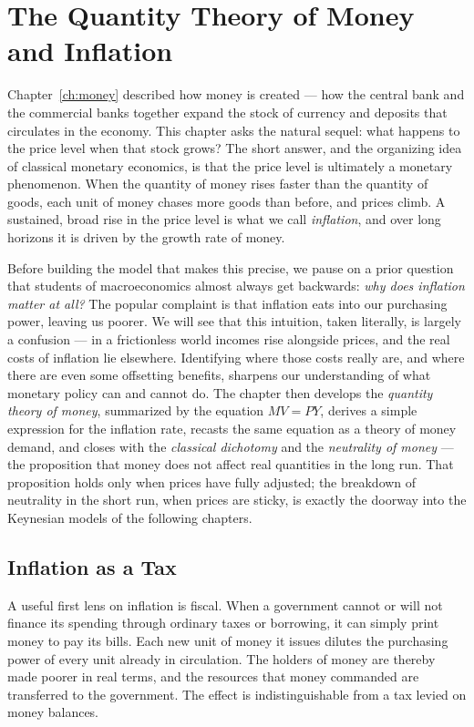 \chapter{The Quantity Theory of Money and Inflation}
\label{ch:quantity}

Chapter~\ref{ch:money} described how money is created --- how the central bank and the commercial banks together expand the stock of currency and deposits that circulates in the economy. This chapter asks the natural sequel: what happens to the price level when that stock grows? The short answer, and the organizing idea of classical monetary economics, is that the price level is ultimately a monetary phenomenon. When the quantity of money rises faster than the quantity of goods, each unit of money chases more goods than before, and prices climb. A sustained, broad rise in the price level is what we call \emph{inflation}, and over long horizons it is driven by the growth rate of money.

Before building the model that makes this precise, we pause on a prior question that students of macroeconomics almost always get backwards: \emph{why does inflation matter at all?} The popular complaint is that inflation eats into our purchasing power, leaving us poorer. We will see that this intuition, taken literally, is largely a confusion --- in a frictionless world incomes rise alongside prices, and the real costs of inflation lie elsewhere. Identifying where those costs really are, and where there are even some offsetting benefits, sharpens our understanding of what monetary policy can and cannot do. The chapter then develops the \emph{quantity theory of money}, summarized by the equation $MV = PY$, derives a simple expression for the inflation rate, recasts the same equation as a theory of money demand, and closes with the \emph{classical dichotomy} and the \emph{neutrality of money} --- the proposition that money does not affect real quantities in the long run. That proposition holds only when prices have fully adjusted; the breakdown of neutrality in the short run, when prices are sticky, is exactly the doorway into the Keynesian models of the following chapters.

\section{Inflation as a Tax}

A useful first lens on inflation is fiscal. When a government cannot or will not finance its spending through ordinary taxes or borrowing, it can simply print money to pay its bills. Each new unit of money it issues dilutes the purchasing power of every unit already in circulation. The holders of money are thereby made poorer in real terms, and the resources that money commanded are transferred to the government. The effect is indistinguishable from a tax levied on money balances.

